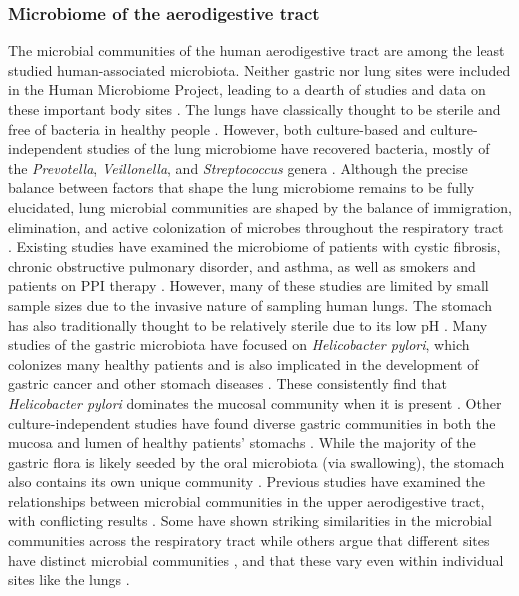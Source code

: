 \documentclass[12pt]{article}
\begin{document}
\subsubsection{Microbiome of the aerodigestive tract}
The microbial communities of the human aerodigestive tract are among the least 
studied human-associated microbiota. 
Neither gastric nor lung sites were included in the 
Human Microbiome Project, leading to a dearth of studies and data on 
these important body sites \cite{bassis-source-2015}. The lungs have classically thought to be sterile and free of bacteria in 
healthy people \cite{bassis-source-2015, beck-lung-2012, charslon-topographical-2011}. 
However, both culture-based
and culture-independent studies of the lung microbiome have recovered
bacteria, mostly of the \textit{Prevotella}, \textit{Veillonella}, and \textit{Streptococcus} genera \cite{bassis-source-2015}. 
Although the precise balance between factors that shape the lung microbiome 
remains to be fully elucidated, lung microbial communities are shaped by the balance of
immigration, elimination, and active colonization of microbes 
throughout the respiratory tract \cite{bassis-source-2015, dickson-lung_microbiome-2014}.
Existing studies have examined the microbiome of patients with cystic fibrosis, chronic obstructive 
pulmonary disorder, and asthma, as well as smokers and patients on PPI therapy 
\cite{almomani-cf_sputum-2016, rosen-ppi-2015, erbdownward-copd-2011}.
However, many of these studies are limited by small sample sizes due to the invasive 
nature of sampling human lungs. The stomach has also traditionally thought to be
relatively sterile due to its low pH \cite{lawson-gastric-2010}.
Many studies of the gastric microbiota have focused on \textit{Helicobacter pylori}, 
which colonizes many healthy patients and is also implicated in the development of gastric cancer and other stomach diseases \cite{bik-stomach-2006}.
These consistently find that \textit{Helicobacter pylori} dominates the mucosal 
community when it is present \cite{lawson-gastric-2010, bik-stomach-2006}.
Other culture-independent studies have found diverse gastric communities in 
both the mucosa and lumen of healthy patients' stomachs \cite{bassis-source-2015, rosen-ppi-2015, lawson-gastric-2010}.
While the majority of the gastric flora is likely seeded by the
oral microbiota (via swallowing), 
the stomach also contains its own unique community \cite{bassis-source-2015, lawson-gastric-2010}. 
Previous studies have examined the relationships between microbial communities in  the upper 
aerodigestive tract, with conflicting results \cite{bassis-source-2015, almomani-cf_sputum-2016, rosen-ppi-2015, charslon-topographical-2011}. 
Some have shown striking similarities in the microbial
communities across the respiratory tract \cite{bassis-source-2015, almomani-cf_sputum-2016} while others
argue that different sites have distinct microbial communities \cite{rosen-ppi-2015},
and that these vary even within individual sites like the lungs \cite{erbdownward-copd-2011, dickson-spatial-2015}.
\end{document}
